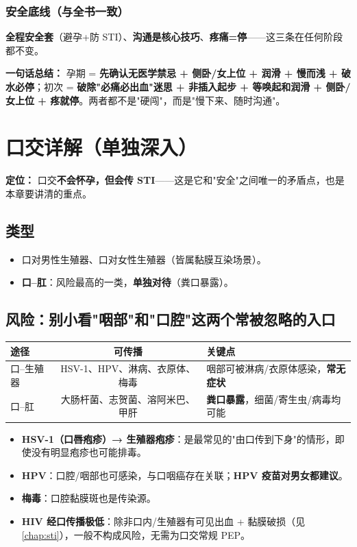 \documentclass[12pt,UTF8,openany]{ctexbook}
\begin{document}
\subsection{安全底线（与全书一致）}

\textbf{全程安全套}（避孕+防 STI）、\textbf{沟通是核心技巧}、\textbf{疼痛=停}——这三条在任何阶段都不变。

\vspace{1em}
\noindent\textbf{一句话总结：} 孕期 = \textbf{先确认无医学禁忌 + 侧卧/女上位 + 润滑 + 慢而浅 + 破水必停}；初次 = \textbf{破除"必痛必出血"迷思 + 非插入起步 + 等唤起和润滑 + 侧卧/女上位 + 疼就停}。两者都不是"硬闯"，而是"慢下来、随时沟通"。

\chapter{口交详解（单独深入）}
\label{chap:oral}

\noindent\textbf{定位：} 口交\textbf{不会怀孕，但会传 STI}——这是它和"安全"之间唯一的矛盾点，也是本章要讲清的重点。

\section{类型}

\begin{itemize}[leftmargin=2em,itemsep=0.3em]
  \item 口对男性生殖器、口对女性生殖器（皆属黏膜互染场景）。
  \item \textbf{口--肛}：风险最高的一类，\textbf{单独对待}（粪口暴露）。
\end{itemize}

\section{风险：别小看"咽部"和"口腔"这两个常被忽略的入口}

\begin{tabularx}{\textwidth}{lC X}
\toprule
途径 & 可传播 & 关键点 \\
\midrule
口--生殖器 & HSV-1、HPV、淋病、衣原体、梅毒 & 咽部可被淋病/衣原体感染，\textbf{常无症状} \\
口--肛 & 大肠杆菌、志贺菌、溶阿米巴、甲肝 & \textbf{粪口暴露}，细菌/寄生虫/病毒均可能 \\
\bottomrule
\end{tabularx}

\vspace{0.5em}
\begin{itemize}[leftmargin=2em,itemsep=0.3em]
  \item \textbf{HSV-1（口唇疱疹）→ 生殖器疱疹}：是最常见的"由口传到下身"的情形，即使没有明显疱疹也可能排毒。
  \item \textbf{HPV}：口腔/咽部也可感染，与口咽癌存在关联；\textbf{HPV 疫苗对男女都建议}。
  \item \textbf{梅毒}：口腔黏膜斑也是传染源。
  \item \textbf{HIV 经口传播极低}：除非口内/生殖器有可见出血 + 黏膜破损（见\ref{chap:sti}），一般不构成风险，无需为口交常规 PEP。
\end{itemize}
\end{document}
